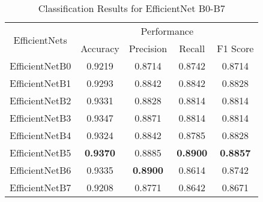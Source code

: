 \begin{table}
    \centering
    \begin{tabular}{c | c c c c}
        \hline
        \hline
        \multirow{2}{*}{EfficientNets} & 
            \multicolumn{4}{c}{Performance}\\& Accuracy
            & Precision & Recall & F1 Score \\
        \hline
        EfficientNetB0 & 0.9219 & 0.8714 & 0.8742 & 0.8714 \\
        EfficientNetB1 & 0.9293 & 0.8842 & 0.8842 & 0.8828 \\
        EfficientNetB2 & 0.9331 & 0.8828 & 0.8814 & 0.8814 \\
        EfficientNetB3 & 0.9347 & 0.8871 & 0.8814 & 0.8814 \\
        EfficientNetB4 & 0.9324 & 0.8842 & 0.8785 & 0.8828 \\
        EfficientNetB5 & \textbf{0.9370} & 0.8885 & \textbf{0.8900} & \textbf{0.8857} \\
        EfficientNetB6  & 0.9335 & \textbf{0.8900} & 0.8614 & 0.8742\\
        EfficientNetB7 & 0.9208 & 0.8771 & 0.8642 & 0.8671 \\
        \hline
    \end{tabular}
    \caption{Classification Results for EfficientNet B0-B7}
    \label{tab:classification_results}
\end{table}